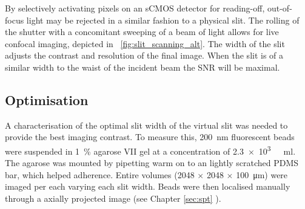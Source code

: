 By selectively activating pixels on an \gls{sCMOS} detector for reading-off, out-of-focus light may be rejected in a similar fashion to a physical slit.
The rolling of the shutter with a concomitant sweeping of a beam of light allows for live confocal imaging, depicted in \figurename~\ref{fig:slit_scanning_alt}.
The width of the slit adjusts the contrast and resolution of the final image.
When the slit is of a similar width to the waist of the incident beam the \gls{SNR} will be maximal.


\subsection{Optimisation}

A characterisation of the optimal slit width of the virtual slit was needed to provide the best imaging contrast.
To measure this, \SI{200}{\nano\metre} fluorescent beads were suspended in \SI{1}{\percent} \gls{agarose VII} gel at a concentration of \SI{2.3e3}{ \per\milli\litre}.
The agarose was mounted by pipetting warm on to an lightly scratched PDMS bar, which helped adherence.
Entire volumes (2048 $\times$ 2048 $\times$ \SI{100}{\micro\metre}) were imaged per each varying each slit width.
Beads were then localised manually through a axially projected image (see Chapter \ref{sec:spt} %
).

